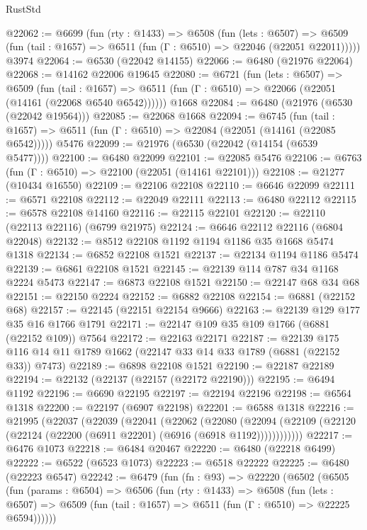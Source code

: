 \begin{lexlean}{RustStd}
\begin{coremodule}
@22062 := @6699
    (fun (rty : @1433) =>
    @6508
      (fun (lets : @6507) =>
      @6509 (fun (tail : @1657) => @6511 (fun (Γ : @6510) => @22046 (@22051 @22011)))))
    @3974
@22064 := @6530 (@22042 @14155)
@22066 := @6480 (@21976 @22064)
@22068 := @14162 @22006 @19645
@22080 := @6721
    (fun (lets : @6507) =>
    @6509
      (fun (tail : @1657) =>
      @6511 (fun (Γ : @6510) => @22066 (@22051 (@14161 (@22068 @6540 @6542))))))
    @1668
@22084 := @6480 (@21976 (@6530 (@22042 @19564)))
@22085 := @22068 @1668
@22094 := @6745
    (fun (tail : @1657) => @6511 (fun (Γ : @6510) => @22084 (@22051 (@14161 (@22085 @6542)))))
    @5476
@22099 := @21976 (@6530 (@22042 (@14154 (@6539 @5477))))
@22100 := @6480 @22099
@22101 := @22085 @5476
@22106 := @6763 (fun (Γ : @6510) => @22100 (@22051 (@14161 @22101)))
@22108 := @21277 (@10434 @16550)
@22109 := @22106 @22108
@22110 := @6646 @22099
@22111 := @6571 @22108
@22112 := @22049 @22111
@22113 := @6480 @22112
@22115 := @6578 @22108 @14160
@22116 := @22115 @22101
@22120 := @22110 (@22113 @22116) (@6799 @21975)
@22124 := @6646 @22112 @22116 (@6804 @22048)
@22132 := @8512 @22108 @1192 @1194 @1186 @35 @1668 @5474 @1318
@22134 := @6852 @22108 @1521
@22137 := @22134 @1194 @1186 @5474
@22139 := @6861 @22108 @1521
@22145 := @22139 @114 @787 @34 @1168 @2224 @5473
@22147 := @6873 @22108 @1521
@22150 := @22147 @68 @34 @68
@22151 := @22150 @2224
@22152 := @6882 @22108
@22154 := @6881 (@22152 @68)
@22157 := @22145 (@22151 @22154 @9666)
@22163 := @22139 @129 @177 @35 @16 @1766 @1791
@22171 := @22147 @109 @35 @109 @1766 (@6881 (@22152 @109)) @7564
@22172 := @22163 @22171
@22187 := @22139 @175 @116 @14 @11 @1789 @1662 (@22147 @33 @14 @33 @1789 (@6881 (@22152 @33)) @7473)
@22189 := @6898 @22108 @1521
@22190 := @22187 @22189
@22194 := @22132 (@22137 (@22157 (@22172 @22190)))
@22195 := @6494 @1192
@22196 := @6690 @22195
@22197 := @22194 @22196
@22198 := @6564 @1318
@22200 := @22197 (@6907 @22198)
@22201 := @6588 @1318
@22216 := @21995
    (@22037
      (@22039
        (@22041
          (@22062
            (@22080
              (@22094 (@22109 (@22120 (@22124 (@22200 (@6911 @22201) (@6916 (@6918 @1192))))))))))))
@22217 := @6476 @1073
@22218 := @6484 @20467
@22220 := @6480 (@22218 @6499)
@22222 := @6522 (@6523 @1073)
@22223 := @6518 @22222
@22225 := @6480 (@22223 @6547)
@22242 := @6479
    (fun (fn : @93) =>
    @22220
      (@6502
        (@6505
          (fun (params : @6504) =>
          @6506
            (fun (rty : @1433) =>
            @6508
              (fun (lets : @6507) =>
              @6509 (fun (tail : @1657) => @6511 (fun (Γ : @6510) => @22225 @6594))))))

\end{coremodule}
\end{lexlean}

